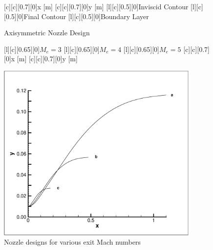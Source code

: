 \begin{figure}[!hb]
\begin{center}

[c][c][0.7][0]{x [m]}
[c][c][0.7][0]{y [m]}
[l][c][0.5][0]{Inviscid Contour}
[l][c][0.5][0]{Final Contour}
[l][c][0.5][0]{Boundary Layer}
\caption{Axisymmetric Nozzle Design}
\label{fig:inviscid}
\end{center}
\end{figure}

\begin{figure}[ht]
\begin{center}
[l][c][0.65][0]{$M_e = 3$}
[l][c][0.65][0]{$M_e = 4$}
[l][c][0.65][0]{$M_e = 5$}
[c][c][0.7][0]{x [m]}
[c][c][0.7][0]{y [m]}

\includegraphics[width=10cm]{nozcomp.eps}
\caption{Nozzle designs for various exit Mach numbers}
\label{fig:contcomp}
\end{center}
\end{figure}


